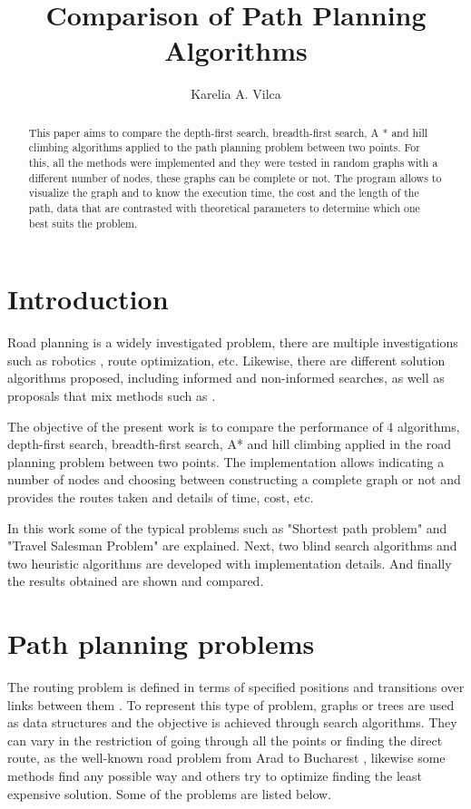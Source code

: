 \documentclass[12pt]{article}
\title{Comparison of Path Planning Algorithms\\ }
\author{Karelia A. Vilca\inst{1}}
\begin{document}
 


\maketitle

\begin{abstract}
This paper aims to compare the depth-first search, breadth-first search, A * and hill climbing algorithms applied to the path planning problem between two points. For this, all the methods were implemented and they were tested in random graphs with a different number of nodes, these graphs can be complete or not. The program allows to visualize the graph and to know the execution time, the cost and the length of the path, data that are contrasted with theoretical parameters to determine which one best suits the problem. 
\end{abstract}
\section{Introduction}
Road planning is a widely investigated problem, there are multiple investigations such as robotics \cite{shwail2013probabilistic}, route optimization, etc. Likewise, there are different solution algorithms proposed, including informed and non-informed searches, as well as proposals that mix methods such as \cite{felner2003kbfs}.

The objective of the present work is to compare the performance of 4 algorithms, depth-first search, breadth-first search, A* and hill climbing applied in the road planning problem between two points. The implementation allows indicating a number of nodes and choosing between constructing a complete graph or not and provides the routes taken and details of time, cost, etc.

In this work some of the typical problems such as "Shortest path problem" and "Travel Salesman Problem" are explained. Next, two blind search algorithms and two heuristic algorithms are developed with implementation details. And finally the results obtained are shown and compared.

\section{Path planning problems}
The routing problem is defined in terms of specified positions and transitions over links between them \cite{russell2004inteligencia}. 
To represent this type of problem, graphs or trees are used as data structures and the objective is achieved through search algorithms.
They can vary in the restriction of going through all the points or finding the direct route, as the well-known road problem from Arad to Bucharest \cite{russell2004inteligencia}, likewise some methods find any possible way and others try to optimize finding the least expensive solution. Some of the problems are listed below.
\end{document}
